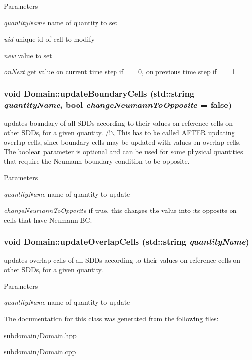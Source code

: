 \begin{DoxyParams}{Parameters}
\item[{\em quantityName}]name of quantity to set \item[{\em uid}]unique id of cell to modify \item[{\em new}]value to set \item[{\em onNext}]get value on current time step if == 0, on previous time step if == 1 \end{DoxyParams}
\hypertarget{classDomain_af169473470489edc4235399887c10da0}{
\subsubsection[{updateBoundaryCells}]{\setlength{\rightskip}{0pt plus 5cm}void Domain::updateBoundaryCells (std::string {\em quantityName}, \/  bool {\em changeNeumannToOpposite} = {\ttfamily false})}}
\label{classDomain_af169473470489edc4235399887c10da0}


updates boundary of all SDDs according to their values on reference cells on other SDDs, for a given quantity. /!$\backslash$ This has to be called AFTER updating overlap cells, since boundary cells may be updated with values on overlap cells. The boolean parameter is optional and can be used for some physical quantities that require the Neumann boundary condition to be opposite.


\begin{DoxyParams}{Parameters}
\item[{\em quantityName}]name of quantity to update \item[{\em changeNeumannToOpposite}]if true, this changes the value into its opposite on cells that have Neumann BC. \end{DoxyParams}
\hypertarget{classDomain_abcd8aa2529907b8022e41e45c85f5144}{
\subsubsection[{updateOverlapCells}]{\setlength{\rightskip}{0pt plus 5cm}void Domain::updateOverlapCells (std::string {\em quantityName})}}
\label{classDomain_abcd8aa2529907b8022e41e45c85f5144}


updates overlap cells of all SDDs according to their values on reference cells on other SDDs, for a given quantity. 
\begin{DoxyParams}{Parameters}
\item[{\em quantityName}]name of quantity to update \end{DoxyParams}


The documentation for this class was generated from the following files:\begin{DoxyCompactItemize}
\item 
subdomain/\hyperlink{Domain_8hpp}{Domain.hpp}\item 
subdomain/Domain.cpp\end{DoxyCompactItemize}
